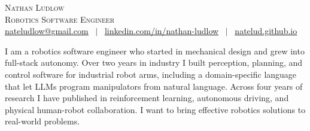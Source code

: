 \documentclass[letterpaper,10pt]{article}
\begin{document}
\newcommand{\name}{Nathan Ludlow}
\newcommand{\role}{Robotics Software Engineer}
\newcommand{\workemail}{nateludlow@gmail.com}
\newcommand{\linkedin}{linkedin.com/in/nathan-ludlow}
\newcommand{\website}{natelud.github.io}

\begin{center}
    {\Huge \scshape \name} \\ \vspace{3pt}
    {\large \scshape \role} \\ \vspace{3pt}
    \small
    \href{mailto:\workemail}{\underline{\workemail}} ~$\vert$~
    \href{https://\linkedin}{\underline{\linkedin}} ~$\vert$~
    \href{https://\website}{\underline{\website}}
\end{center}
\vspace{2pt}

{\setlength{\fboxsep}{6pt}%
\noindent\colorbox{boxbg}{%
\begin{minipage}{\dimexpr\textwidth-2\fboxsep\relax}
\small
I am a robotics software engineer who started in mechanical design and grew into full-stack autonomy. Over two years in industry I built perception, planning, and control software for industrial robot arms, including a domain-specific language that let LLMs program manipulators from natural language. Across four years of research I have published in reinforcement learning, autonomous driving, and physical human-robot collaboration. I want to bring effective robotics solutions to real-world problems.
\end{minipage}}}
\vspace{3pt}
\end{document}
